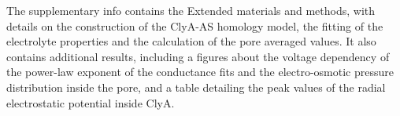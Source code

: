 \documentclass[journal=ancac3,manuscript=article,etalmode=truncate,maxauthors=0,layout=twocolumn]{achemso}
\begin{document}
\begin{suppinfo}
	The supplementary info contains the Extended materials and methods, with details on the construction of the
	ClyA-AS homology model, the fitting of the electrolyte properties and the calculation of the pore averaged
	values. It also contains additional results, including a figures about the voltage dependency of the
	power-law exponent of the conductance fits and the electro-osmotic pressure distribution inside the pore,
	and a table detailing the peak values of the radial electrostatic potential inside ClyA.
\end{suppinfo}



%
\end{document}
